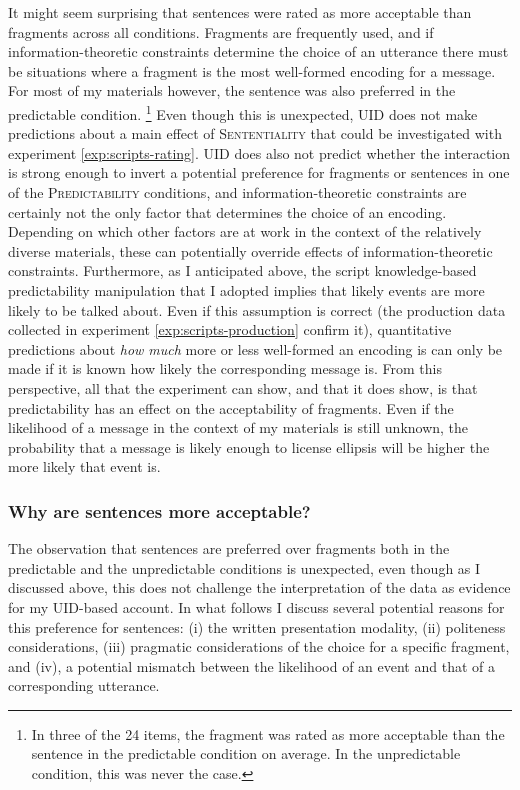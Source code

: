 It might seem surprising that sentences were rated as more acceptable than fragments across all conditions. Fragments are frequently used, and if information-theoretic constraints determine the choice of an utterance there must be situations where a fragment is the most well-formed encoding for a message. For most of my materials however, the sentence was also preferred in the predictable condition.%
%
\footnote{In three of the 24 items, the fragment was rated as more acceptable than the sentence in the predictable condition on average. In the unpredictable condition, this was never the case.}\afterfn%
%
Even though this is unexpected, UID does not make predictions about a main effect of \textsc{Sententiality} that could be investigated with experiment \ref{exp:scripts-rating}. UID does also not predict whether the interaction is strong enough to invert a potential preference for fragments or sentences in one of the \textsc{Predictability} conditions, and information-theoretic constraints are certainly not the only factor that determines the choice of an encoding. Depending on which other factors are at work in the context of the relatively diverse materials, these can potentially override effects of information-theoretic constraints. Furthermore, as I anticipated above, the script knowledge-based predictability manipulation that I adopted implies that likely events are more likely to be talked about. Even if this assumption is correct (the production data collected in experiment \ref{exp:scripts-production} confirm it), quantitative predictions about \textit{how much} more or less well-formed an encoding is can only be made if it is known how likely the corresponding message is. From this perspective, all that the experiment can show, and that it does show, is that predictability has an effect on the acceptability of fragments. Even if the likelihood of a message in the context of my materials is still unknown, the probability that a message is likely enough to license ellipsis will be higher the more likely that event is. 

\subsubsection{Why are sentences more acceptable?}

The observation that sentences are preferred over fragments both in the predictable and the unpredictable conditions is unexpected, even though as I discussed above, this does not challenge the interpretation of the data as evidence for my UID-based account. In what follows I discuss several potential reasons for this preference for sentences: (i) the written presentation modality, (ii) politeness considerations, (iii) pragmatic considerations of the choice for a specific fragment, and (iv), a potential mismatch between the likelihood of an event and that of a corresponding utterance. 

